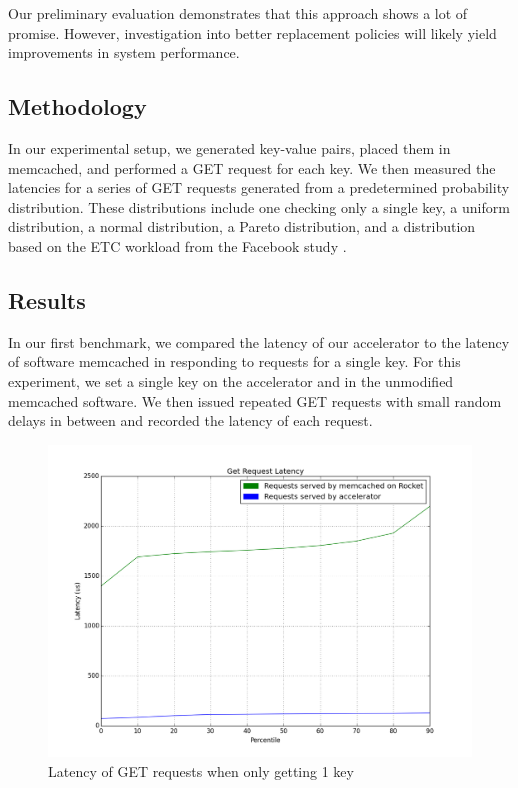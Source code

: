 Our preliminary evaluation demonstrates that this approach shows a lot of
promise. However, investigation into better replacement policies will
likely yield improvements in system performance.

\subsection{Methodology}

In our experimental setup, we generated key-value pairs, placed them in
memcached, and performed a GET request for each key. We then measured the
latencies for a series of GET requests generated from a predetermined
probability distribution. These distributions include one checking only a
single key, a uniform distribution, a normal distribution, a Pareto
distribution, and a distribution based on the ETC workload from the Facebook
study \cite{AXFJP2012}.

\subsection{Results}

In our first benchmark, we compared the latency of our accelerator to the
latency of software memcached in responding to requests for a single key.
For this experiment, we set a single key on the accelerator and in the
unmodified memcached software. We then issued repeated GET requests with
small random delays in between and recorded the latency of each request.

\begin{figure}[t]
\begin{center}
\includegraphics[width=\linewidth]{graph.png}
\caption{Latency of GET requests when only getting 1 key}
\label{fig:one-req}
\end{center}
\end{figure}

